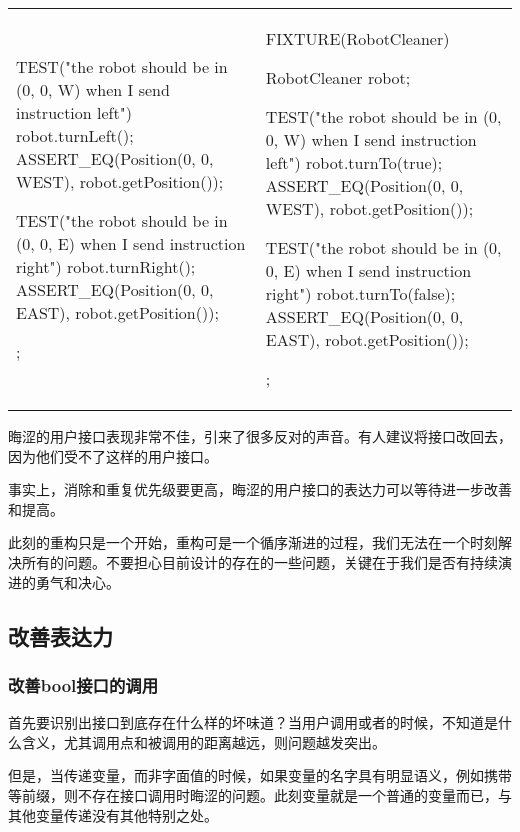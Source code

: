 \begin{content}
\begin{tabular}{@{}p{} 
                 | p{}@{}}
\begin{c++}[caption={test/robot-cleaner/TestRobotCleaner.h}]
{    TEST("the robot should be in (0, 0, W) when I send instruction left")
    {
        robot.turnLeft();
        ASSERT_EQ(Position(0, 0, WEST), robot.getPosition());
    }

    TEST("the robot should be in (0, 0, E) when I send instruction right")
    {
        robot.turnRight();
        ASSERT_EQ(Position(0, 0, EAST), robot.getPosition());
    }
};
\end{c++}
&
\begin{c++}[caption={test/robot-cleaner/TestRobotCleaner.h}]
FIXTURE(RobotCleaner)
{
    RobotCleaner robot;

    TEST("the robot should be in (0, 0, W) when I send instruction left")
    {
        robot.turnTo(true);
        ASSERT_EQ(Position(0, 0, WEST), robot.getPosition());
    }

    TEST("the robot should be in (0, 0, E) when I send instruction right")
    {
        robot.turnTo(false);
        ASSERT_EQ(Position(0, 0, EAST), robot.getPosition());
    }
};
\end{c++}
\end{tabular}

晦涩的用户接口表现非常不佳，引来了很多反对的声音。有人建议将接口改回去，因为他们受不了这样的用户接口。

事实上，消除和重复优先级要更高，晦涩的用户接口的表达力可以等待进一步改善和提高。

此刻的重构只是一个开始，重构可是一个循序渐进的过程，我们无法在一个时刻解决所有的问题。不要担心目前设计的存在的一些问题，关键在于我们是否有持续演进的勇气和决心。

\subsection{改善表达力}

\subsubsection{改善bool接口的调用}

首先要识别出接口到底存在什么样的坏味道？当用户调用或者的时候，不知道是什么含义，尤其调用点和被调用的距离越远，则问题越发突出。

但是，当传递变量，而非字面值的时候，如果变量的名字具有明显语义，例如携带等前缀，则不存在接口调用时晦涩的问题。此刻变量就是一个普通的变量而已，与其他变量传递没有其他特别之处。


\end{content}
